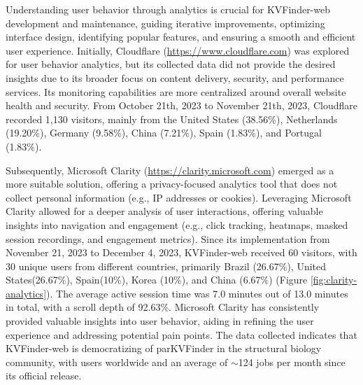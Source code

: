 \documentclass[Ingles]{phdthesis}
\def\eg{e.g.\onedot}
\begin{document}
Understanding user behavior through analytics is crucial for KVFinder-web development and maintenance, guiding iterative improvements, optimizing interface design, identifying popular features, and ensuring a smooth and efficient user experience. Initially, Cloudflare (\url{https://www.cloudflare.com}) was explored for user behavior analytics, but its collected data did not provide the desired insights due to its broader focus on content delivery, security, and performance services. Its monitoring capabilities are more centralized around overall website health and security. From October 21th, 2023 to November 21th, 2023, Cloudflare recorded 1,130 visitors, mainly from the United States (38.56\%), Netherlands (19.20\%), Germany (9.58\%), China (7.21\%), Spain (1.83\%), and Portugal (1.83\%). 

Subsequently, Microsoft Clarity (\url{https://clarity.microsoft.com}) emerged as a more suitable solution, offering a privacy-focused analytics tool that does not collect personal information (\eg, IP addresses or cookies). Leveraging Microsoft Clarity allowed for a deeper analysis of user interactions, offering valuable insights into navigation and engagement (\eg, click tracking, heatmaps, masked session recordings, and engagement metrics). Since its implementation from November 21, 2023 to December 4, 2023, KVFinder-web received 60 visitors, with 30 unique users from different countries, primarily Brazil (26.67\%), United States(26.67\%), Spain(10\%), Korea (10\%), and China (6.67\%) (Figure \ref{fig:clarity-analytics}). The average active session time was 7.0 minutes out of 13.0 minutes in total, with a scroll depth of 92.63\%. Microsoft Clarity has consistently provided valuable insights into user behavior, aiding in refining the user experience and addressing potential pain points. The data collected indicates that KVFinder-web is democratizing of parKVFinder in the structural biology community, with users worldwide and an average of $\sim$124 jobs per month since its official release.
\end{document}
